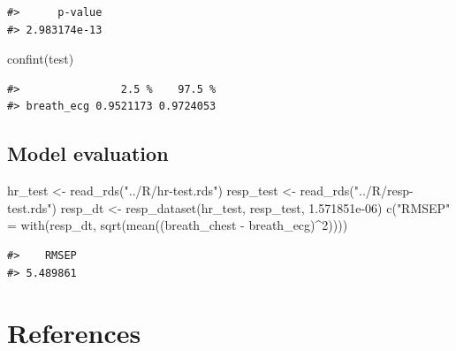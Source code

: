 \documentclass[
]{article}
\newenvironment{Shaded}{\begin{snugshade}}{\end{snugshade}}
\newcommand{\DecValTok}[1]{\textcolor[rgb]{0.00,0.00,0.81}{#1}}
\newcommand{\FloatTok}[1]{\textcolor[rgb]{0.00,0.00,0.81}{#1}}
\newcommand{\FunctionTok}[1]{\textcolor[rgb]{0.00,0.00,0.00}{#1}}
\newcommand{\NormalTok}[1]{#1}
\newcommand{\OtherTok}[1]{\textcolor[rgb]{0.56,0.35,0.01}{#1}}
\newcommand{\SpecialCharTok}[1]{\textcolor[rgb]{0.00,0.00,0.00}{#1}}
\newcommand{\StringTok}[1]{\textcolor[rgb]{0.31,0.60,0.02}{#1}}
\begin{document}
\begin{verbatim}
#>      p-value 
#> 2.983174e-13
\end{verbatim}

\begin{Shaded}
\begin{Highlighting}[]
\FunctionTok{confint}\NormalTok{(test)}
\end{Highlighting}
\end{Shaded}

\begin{verbatim}
#>                2.5 %    97.5 %
#> breath_ecg 0.9521173 0.9724053
\end{verbatim}

\hypertarget{model-evaluation-1}{%
\subsection{Model evaluation}\label{model-evaluation-1}}

\begin{Shaded}
\begin{Highlighting}[]
\NormalTok{hr\_test }\OtherTok{\textless{}{-}} \FunctionTok{read\_rds}\NormalTok{(}\StringTok{"../R/hr{-}test.rds"}\NormalTok{)}
\NormalTok{resp\_test }\OtherTok{\textless{}{-}} \FunctionTok{read\_rds}\NormalTok{(}\StringTok{"../R/resp{-}test.rds"}\NormalTok{)}
\NormalTok{resp\_dt }\OtherTok{\textless{}{-}} \FunctionTok{resp\_dataset}\NormalTok{(hr\_test, resp\_test, }\FloatTok{1.571851e{-}06}\NormalTok{)}
\FunctionTok{c}\NormalTok{(}\StringTok{"RMSEP"} \OtherTok{=} \FunctionTok{with}\NormalTok{(resp\_dt, }\FunctionTok{sqrt}\NormalTok{(}\FunctionTok{mean}\NormalTok{((breath\_chest }\SpecialCharTok{{-}}\NormalTok{ breath\_ecg)}\SpecialCharTok{\^{}}\DecValTok{2}\NormalTok{))))}
\end{Highlighting}
\end{Shaded}

\begin{verbatim}
#>    RMSEP 
#> 5.489861
\end{verbatim}

\newpage

\hypertarget{references}{%
\section*{References}\label{references}}
\end{document}
